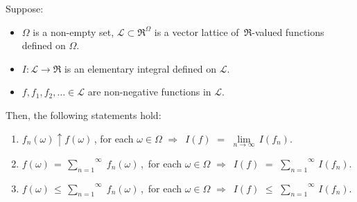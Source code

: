 \begin{lemma}
\mbox{}\vskip 0.1cm
\noindent
Suppose:
\begin{itemize}
\item
	$\Omega$ is a non-empty set,
	$\mathcal{L} \subset \Re^{\Omega}$ is a vector lattice of \,$\Re$-valued functions defined on $\Omega$.
\item
	$I : \mathcal{L} \longrightarrow \Re$ is an elementary integral defined on $\mathcal{L}$.
\item
	$f, f_{1}, f_{2}, \ldots \in \mathcal{L}$ are non-negative functions in $\mathcal{L}$.
\end{itemize}
Then, the following statements hold:
\begin{enumerate}
\item
	$f_{n}(\omega) \uparrow f(\omega)$\,, for each $\omega\in\Omega$
	\;\;$\Longrightarrow$\;\,
	$I(f)$ $=$ $\underset{n\rightarrow\infty}{\lim}\,I(f_{n})$.
\item
	$f(\omega) \,=\, \overset{\infty}{\underset{n=1}{\sum}}\;f_{n}(\omega)$\,,\,
	for each $\omega\in\Omega$
	\;\;$\Longrightarrow$\;\,
	$I(f)$ $=$ $\overset{\infty}{\underset{n=1}{\sum}}\,I(f_{n})$.
\item
	$f(\omega) \,\leq\, \overset{\infty}{\underset{n=1}{\sum}}\;f_{n}(\omega)$\,,\,
	for each $\omega\in\Omega$
	\;\;$\Longrightarrow$\;\,
	$I(f)$ $\leq$ $\overset{\infty}{\underset{n=1}{\sum}}\,I(f_{n})$.
\end{enumerate}
\end{lemma}
\proof
